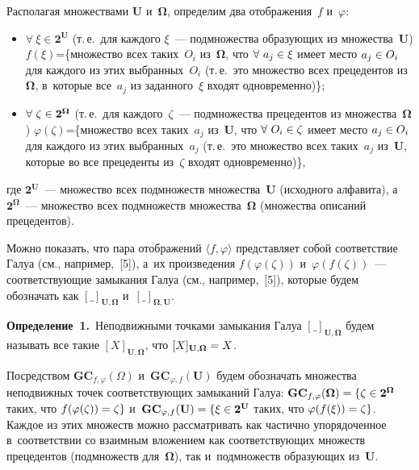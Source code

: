 \begin{multicols}{2}
    Располагая множествами $\mathbf{U}$ и~$\boldsymbol{\Omega}$, определим два 
отображения~$f$ и~$\varphi$:
       \begin{itemize}
   \item 
$\forall\ \xi \in \mathbf{2}^{\mathbf{U}}$ (т.\,е.\ для каждого $\xi$~--- 
подмножества образующих из множества~$\mathbf{U}$)
$f(\xi)$\;=\;\{множество всех таких~$O_i$ из~$\boldsymbol{\Omega}$, что $\forall\ 
a_j\hm\in \xi$ имеет место $a_j\hm\in O_i$ для каждого из этих 
выбранных~$O_i$ (т.\,е.\ это множество всех прецедентов 
из~$\boldsymbol{\Omega}$, в~которые все~$a_j$ из заданного~$\xi$ входят 
одновременно)\};\\[-15pt]

\item
$\forall\ \zeta \hm\in \mathbf{2}^{\boldsymbol{\Omega}}$ (т.\,е.\ для каждого~$\zeta$~--- 
подмножества прецедентов из множества~$\boldsymbol{\Omega}$)
$\varphi(\zeta)$\;=\;\{множество всех таких~$a_j$ из~$\mathbf{U}$, что 
$\forall\ O_i\hm\in \zeta$ имеет место $a_j\hm\in O_i$ для каждого из 
этих выбранных~$a_j$ (т.\,е.\ это множество всех таких~$a_j$ 
из~$\mathbf{U}$, которые во все прецеденты из~$\zeta$ входят 
одновременно)\}, \\[-15pt]
\end{itemize}
где
$\mathbf{2}^{\mathbf{U}}$~--- множество всех подмножеств 
множества~$\mathbf{U}$ (исходного алфавита), а~$\mathbf{2}^{\boldsymbol{\Omega}}$~--- 
множество всех подмножеств множества~$\boldsymbol{\Omega}$ (множества описаний 
прецедентов).

    Можно показать, что пара отображений $\langle f,\varphi\rangle$ 
представляет собой соответствие Галуа (см., например,~[5]), а~их 
произведения $f(\varphi(\zeta))$  и~$\varphi (f(\zeta))$~--- соответствующие 
замыкания Галуа (см., например,~[5]), которые будем обозначать как 
$[\_]_{\mathbf{U},\boldsymbol{\Omega}}$ и~$[\_]_{\boldsymbol{\Omega},\mathbf{U}}$. 
    
    \smallskip
    
    \noindent
    \textbf{Определение~1.}\ Неподвижными точками замыкания Галуа 
$[\_]_{\mathbf{U},\boldsymbol{\Omega}}$ будем называть все такие 
$[{X}]_{\mathbf{U},\boldsymbol{\Omega}}$, что 
$[{X}]_{\mathbf{U},\boldsymbol{\Omega}} \hm= {X}$.
    
    Посредством $\mathbf{GC}_{f,\varphi} (\Omega)$ 
    и~$\mathbf{GC}_{\varphi,f} (\mathbf{U})$ будем обозначать множества 
неподвижных точек соответствующих замыканий Галуа: 
$\mathbf{GC}_{f,\varphi} (\boldsymbol{\Omega}) \hm= 
\{\zeta\hm\in \mathbf{2}^{\boldsymbol{\Omega}}$ таких, 
что $f(\varphi (\zeta)) \hm= \zeta\}$ и~$\mathbf{GC}_{\varphi,f} 
(\mathbf{U}) 
\hm= \{\xi\hm\in \mathbf{2}^{\mathbf{U}}$ таких, что $\varphi (f(\xi)) \hm= 
\zeta\}$. Каждое из этих множеств можно рассматривать как частично 
упорядоченное в~соответствии со взаимным вложением как 
соответствующих множеств прецедентов (подмножеств для~$\boldsymbol{\Omega}$), так 
и~подмножеств образующих из~$\mathbf{U}$.
    

\end{multicols}
